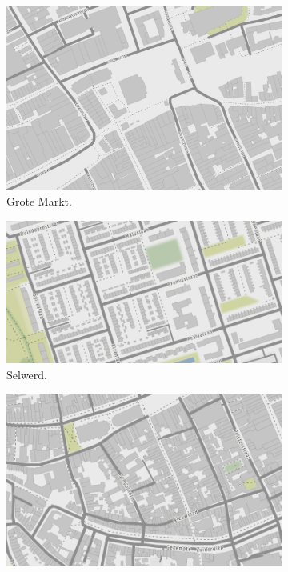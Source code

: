 \begin{figure}[htbp]
\begin{center}
\begin{subfigure}{.5\textwidth}
\includegraphics[width=0.8\linewidth]{../experiments/GroteMarktMaps/maps/groteMarkt.png}
\caption{Grote Markt.}
\end{subfigure}%
\begin{subfigure}{.5\textwidth}
\includegraphics[width=0.8\linewidth]{../experiments/GroteMarktMaps/maps/Selwerd.png}
\caption{Selwerd.}
\end{subfigure}
\begin{subfigure}{.5\textwidth}
\includegraphics[width=0.8\linewidth]{../experiments/GroteMarktMaps/maps/zuidCentrum.png}

\end{subfigure}
\end{center}
\end{figure}
